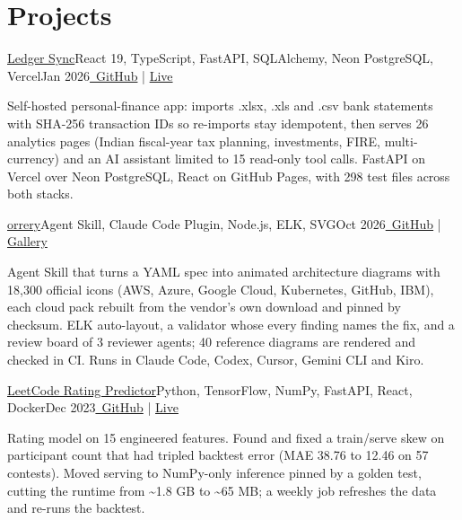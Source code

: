 \section{\textbf{Projects}}
\vspace{-2pt}
\resumeSubHeadingListStart

\resumeExp
{\href{https://sagargupta.online/ledger-sync/}{Ledger Sync}}{React 19, TypeScript, FastAPI, SQLAlchemy, Neon PostgreSQL, Vercel}{Jan 2026}{\href{https://github.com/Sagargupta16/ledger-sync}{\faGithub\ GitHub} | \href{https://sagargupta.online/ledger-sync/}{Live}}
\resumeItemListStart
    \item[$\diamond$] Self-hosted personal-finance app: imports .xlsx, .xls and .csv bank statements with SHA-256 transaction IDs so re-imports stay idempotent, then serves 26 analytics pages (Indian fiscal-year tax planning, investments, FIRE, multi-currency) and an AI assistant limited to 15 read-only tool calls. FastAPI on Vercel over Neon PostgreSQL, React on GitHub Pages, with 298 test files across both stacks.
\resumeItemListEnd

\resumeExp
{\href{https://sagargupta.online/orrery/}{orrery}}{Agent Skill, Claude Code Plugin, Node.js, ELK, SVG}{Oct 2026}{\href{https://github.com/Sagargupta16/orrery}{\faGithub\ GitHub} | \href{https://sagargupta.online/orrery/gallery/}{Gallery}}
\resumeItemListStart
    \item[$\diamond$] Agent Skill that turns a YAML spec into animated architecture diagrams with 18,300 official icons (AWS, Azure, Google Cloud, Kubernetes, GitHub, IBM), each cloud pack rebuilt from the vendor's own download and pinned by checksum. ELK auto-layout, a validator whose every finding names the fix, and a review board of 3 reviewer agents; 40 reference diagrams are rendered and checked in CI. Runs in Claude Code, Codex, Cursor, Gemini CLI and Kiro.
\resumeItemListEnd

\resumeExp
{\href{https://leetcode-rating-predictor.onrender.com/}{LeetCode Rating Predictor}}{Python, TensorFlow, NumPy, FastAPI, React, Docker}{Dec 2023}{\href{https://github.com/Sagargupta16/LeetCode_Rating_Predictor}{\faGithub\ GitHub} | \href{https://leetcode-rating-predictor.onrender.com/}{Live}}
\resumeItemListStart
    \item[$\diamond$] Rating model on 15 engineered features. Found and fixed a train/serve skew on participant count that had tripled backtest error (MAE 38.76 to 12.46 on 57 contests). Moved serving to NumPy-only inference pinned by a golden test, cutting the runtime from \textasciitilde1.8 GB to \textasciitilde65 MB; a weekly job refreshes the data and re-runs the backtest.
\resumeItemListEnd

